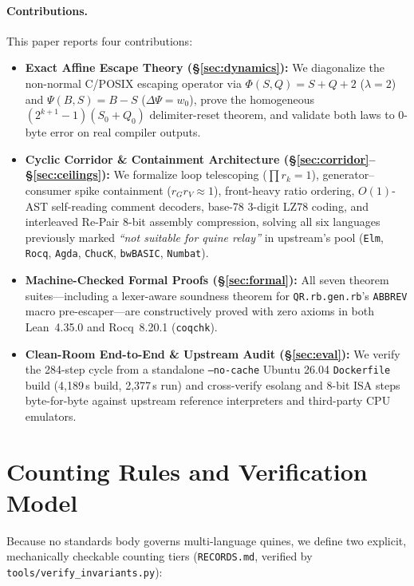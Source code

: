 \documentclass[10pt,twocolumn]{article}
\theoremstyle{definition}
\begin{document}
\paragraph{Contributions.} This paper reports four contributions:
\begin{itemize}
  \item \textbf{Exact Affine Escape Theory (\S\ref{sec:dynamics}):} We diagonalize the non-normal C/POSIX escaping operator via $\Phi(S,Q)=S+Q+2$ ($\lambda=2$) and $\Psi(B,S)=B-S$ ($\Delta\Psi = w_0$), prove the homogeneous $(2^{k+1}-1)(S_0+Q_0)$ delimiter-reset theorem, and validate both laws to 0-byte error on real compiler outputs.
  \item \textbf{Cyclic Corridor \& Containment Architecture (\S\ref{sec:corridor}--\S\ref{sec:ceilings}):} We formalize loop telescoping ($\prod r_k = 1$), generator--consumer spike containment ($r_G r_V \approx 1$), front-heavy ratio ordering, $O(1)$-AST self-reading comment decoders, base-78 3-digit LZ78 coding, and interleaved Re-Pair 8-bit assembly compression, solving all six languages previously marked \emph{``not suitable for quine relay''} in upstream's pool (\texttt{Elm}, \texttt{Rocq}, \texttt{Agda}, \texttt{ChucK}, \texttt{bwBASIC}, \texttt{Numbat}).
  \item \textbf{Machine-Checked Formal Proofs (\S\ref{sec:formal}):} All seven theorem suites---including a lexer-aware soundness theorem for \texttt{QR.rb.gen.rb}'s \texttt{ABBREV} macro pre-escaper---are constructively proved with zero axioms in both Lean~4.35.0 and Rocq~8.20.1 (\texttt{coqchk}).
  \item \textbf{Clean-Room End-to-End \& Upstream Audit (\S\ref{sec:eval}):} We verify the 284-step cycle from a standalone \texttt{--no-cache} Ubuntu 26.04 \texttt{Dockerfile} build (4,189\,s build, 2,377\,s run) and cross-verify esolang and 8-bit ISA steps byte-for-byte against upstream reference interpreters and third-party CPU emulators.
\end{itemize}

\section{Counting Rules and Verification Model}
\label{sec:rules}

Because no standards body governs multi-language quines, we define two explicit, mechanically checkable counting tiers (\texttt{RECORDS.md}, verified by \texttt{tools/verify\_invariants.py}):
\end{document}
